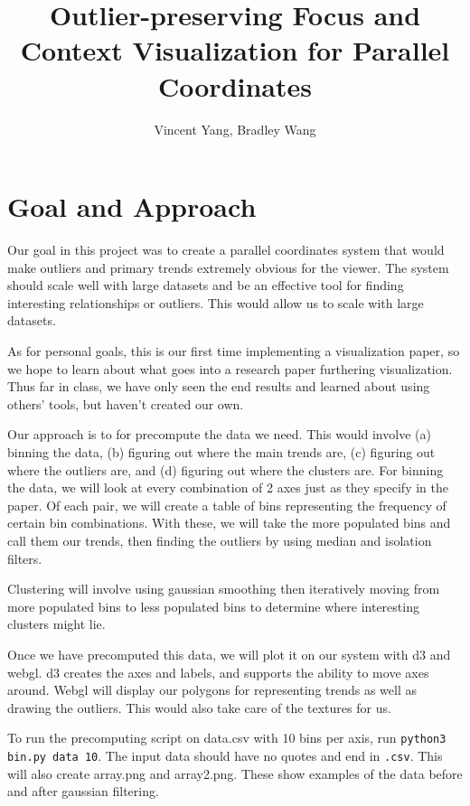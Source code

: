 \documentclass[	DIV=calc,%
			paper=a4,%
			fontsize=11pt,%
			twocolumn]{scrartcl}					%
\title{Outlier-preserving Focus and Context Visualization for Parallel Coordinates}		%
\author{Vincent Yang, Bradley Wang }			%
\date{}										%
\begin{document}
\maketitle
\thispagestyle{fancy} 								%


\section {Goal and Approach}
Our goal in this project was to create a parallel coordinates system that would make outliers and primary trends extremely obvious for the viewer. The system should scale well with large datasets and be an effective tool for finding interesting relationships or outliers. This would allow us
to scale with large datasets.

As for personal goals, this is our first time implementing a visualization paper, so we
hope to learn about what goes into a research paper furthering visualization. 
Thus far in class, we have only seen the end results and learned about using others' tools,
but haven't created our own. 

Our approach is to for precompute the data we need. This would involve (a) binning the data, (b) figuring out 
where the main trends are, (c) figuring out where the outliers are, and (d) figuring out where the clusters are. 
For binning the data, we will look at every combination of 2 axes just as they specify in the paper. Of each pair,
we will create a table of bins representing the frequency of certain bin combinations. With these, we will take the
more populated bins and call them our trends, then finding the outliers by using median and isolation filters.

Clustering will involve using gaussian smoothing then iteratively moving from more populated bins
to less populated bins to determine where interesting clusters might lie. 

Once we have precomputed this data, we will plot it on our system with d3 and webgl. d3 creates
the axes and labels, and supports the ability to move axes around. Webgl will display our polygons for
representing trends as well as drawing the outliers. This would also take care of the textures for us. 

To run the precomputing script on data.csv with 10 bins per axis, run \texttt{python3 bin.py data 10}. The input
data should have no quotes and end in \texttt{.csv}. This will also create array.png and array2.png. These show examples of the 
data before and after gaussian filtering. 
\end{document}
